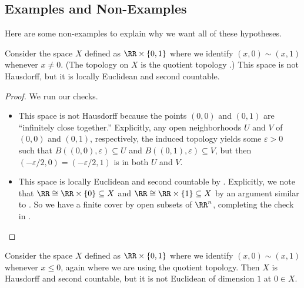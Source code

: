 \documentclass[../notes.tex]{subfiles}
\begin{document}
\subsection{Examples and Non-Examples}
Here are some non-examples to explain why we want all of these hypotheses.
\begin{exe}
	Consider the space $X$ defined as $\RR\times\{0,1\}$ where we identify $(x,0)\sim(x,1)$ whenever $x\ne0$. (The topology on $X$ is the quotient topology \cite[Definition~2.81]{elber-top}.) This space is not Hausdorff, but it is locally Euclidean and second countable.
\end{exe}
\begin{proof}
	We run our checks.
	\begin{itemize}
		\item This space is not Hausdorff because the points $(0,0)$ and $(0,1)$ are ``infinitely close together.'' Explicitly, any open neighborhoods $U$ and $V$ of  $(0,0)$ and $(0,1)$, respectively, the induced topology yields some $\varepsilon>0$ such that $B((0,0),\varepsilon)\subseteq U$ and $B((0,1),\varepsilon)\subseteq V$, but then $(-\varepsilon/2,0)=(-\varepsilon/2,1)$ is in both $U$ and $V$.
		\item This space is locally Euclidean and second countable by . Explicitly, we note that $\RR\cong\RR\times\{0\}\subseteq X$ and $\RR\cong\RR\times\{1\}\subseteq X$ by an argument similar to . So we have a finite cover by open subsets of $\RR^n$, completing the check in .
		\qedhere
	\end{itemize}
\end{proof}
\begin{exe}
	Consider the space $X$ defined as $\RR\times\{0,1\}$ where we identify $(x,0)\sim(x,1)$ whenever $x\le0$, again where we are using the quotient topology. Then $X$ is Hausdorff and second countable, but it is not Euclidean of dimension $1$ at $0\in X$.
\end{exe}
\end{document}
